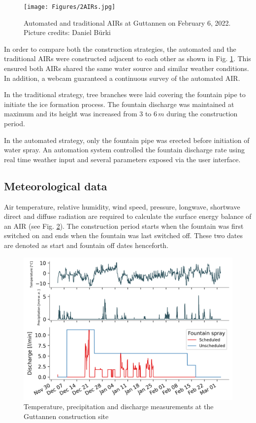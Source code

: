 \documentclass[tc, manuscript]{copernicus}
\begin{document}
\begin{figure}[t]
\texttt{[image: Figures/2AIRs.jpg]}
\caption{Automated and traditional AIRs  at Guttannen on February 6, 2022. Picture credits: Daniel Bürki}
\label{fig:2AIR} 
\end{figure}

In order to compare both the construction strategies, the automated and the traditional AIRs were constructed
adjacent to each other as shown in Fig. \ref{fig:2AIR}. This ensured both AIRs shared the same water source
and similar weather conditions. In addition, a webcam guaranteed a continuous survey of the automated AIR.   

In the traditional strategy, tree branches were laid covering the fountain pipe to initiate the ice formation
process. The fountain discharge was maintained at maximum and its height was increased from 3 to 6\,$m$ during
the construction period.

In the automated strategy, only the fountain pipe was erected before initiation of water spray. An automation
system controlled the fountain discharge rate using real time weather input and several parameters exposed via
the user interface. 

\subsection{Meteorological data}

Air temperature, relative humidity, wind speed, pressure, longwave, shortwave direct and diffuse radiation are
required to calculate the surface energy balance of an AIR (see Fig. \ref{fig:aws}). The construction period
starts when the fountain was first switched on and ends when the fountain was last switched off. These two dates
are denoted as start and fountain off dates henceforth.

\begin{figure}[t]
\includegraphics[width=12cm]{Figures/data.png}
\caption{Temperature, precipitation and discharge measurements at the Guttannen construction site}
\label{fig:aws} 
\end{figure}
\end{document}
